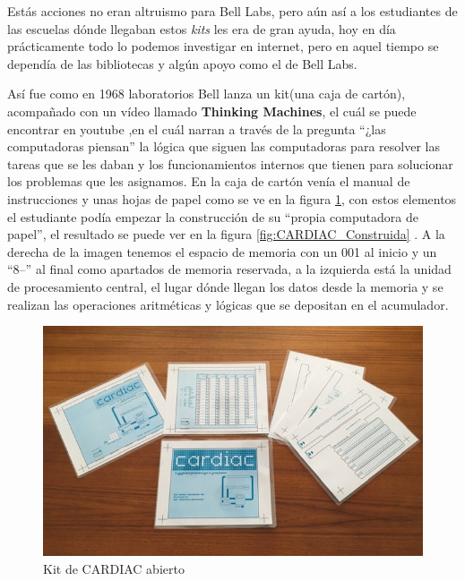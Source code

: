 \documentclass[letterpaper,12pt,oneside]{book}
\begin{document}
		
		Estás acciones no eran altruismo para Bell Labs, pero aún así a los estudiantes de las 
		escuelas dónde
		llegaban estos \textit{kits} les era de gran ayuda, hoy en día prácticamente todo lo podemos investigar en internet, pero en aquel tiempo se dependía de las
		bibliotecas y algún apoyo como el de Bell Labs.
		
		Así fue como en 1968 laboratorios Bell lanza un kit(una caja de cartón), acompañado con un vídeo llamado \textbf{Thinking Machines}, el
		cuál se puede encontrar en youtube \cite{att_tech_channel_att_2012} ,en el cuál narran
		a través de la pregunta ``¿las computadoras piensan'' la lógica que siguen las computadoras para resolver las tareas que se les daban y los funcionamientos
		internos que tienen para solucionar los problemas que les asignamos. En la caja de cartón venía el manual de instrucciones 
		\cite{david_hegelbarger_instruction_1968} y unas hojas de papel como se ve en la figura \ref{fig:Kit_CARDIAC}, con estos elementos el 
		estudiante podía empezar la construcción de su ``propia computadora de papel'', el resultado se puede ver en la figura \ref{fig:CARDIAC_Construida} 
		\cite{megardi_cardiac_nodate}.
		A la derecha de la imagen tenemos el espacio de memoria con un 001 al inicio y un ``8--'' al final como apartados de memoria reservada, a la izquierda
		está la unidad de procesamiento central, el lugar dónde llegan los datos desde la memoria y se realizan las operaciones aritméticas y lógicas
		que se depositan en el acumulador.
		
		\begin{figure}[h]
			\includegraphics[scale=0.3]{media/CARDIAC_Paper/paper1.jpg}
			\caption{Kit de CARDIAC abierto}
			\label{fig:Kit_CARDIAC}
		\end{figure}
		
\end{document}
